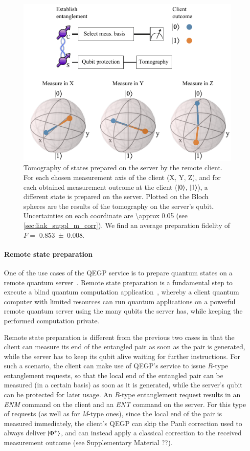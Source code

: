 \begin{figure}
    \centering
    \includegraphics[width=0.6\linewidth]{figures/rsprep.pdf}
    \caption{
        Tomography of states prepared on the server by the remote client. For each chosen
        measurement axis of the client (X, Y, Z), and for each obtained measurement outcome at the
        client ($\ket{0}$, $\ket{1}$), a different state is prepared on the server. Plotted on the
        Bloch spheres are the results of the tomography on the server's qubit. Uncertainties on each
        coordinate are \num{\approx 0.05} (see \cref{sec:link_suppl_m_corr}). We find an average
        preparation fidelity of $F =$ \num{0.853(8)}.
    }
    \label{fig:rsprep}
\end{figure}

\paragraph{Remote state preparation}

One of the use cases of the QEGP service is to prepare quantum states on a remote quantum
server~\cite{dahlberg_2019_egp}. Remote state preparation is a fundamental step to execute a blind
quantum computation application~\cite{broadbent_2009_ubqc}, whereby a client quantum computer with
limited resources can run quantum applications on a powerful remote quantum server using the many
qubits the server has, while keeping the performed computation private.

Remote state preparation is different from the previous two cases in that the client can measure its
end of the entangled pair as soon as the pair is generated, while the server has to keep its qubit
alive waiting for further instructions. For such a scenario, the client can make use of QEGP's
service to issue \emph{R}-type entanglement requests, so that the local end of the entangled pair
can be measured (in a certain basis) as soon as it is generated, while the server's qubit can be
protected for later usage. An \emph{R}-type entanglement request results in an \emph{ENM} command on
the client and an \emph{ENT} command on the server. For this type of requests (as well as for
\emph{M}-type ones), since the local end of the pair is measured immediately, the client's QEGP can
skip the Pauli correction used to always deliver $\ket{\Phi^+}$, and can instead apply a classical
correction to the received measurement outcome (see Supplementary Material ??).

